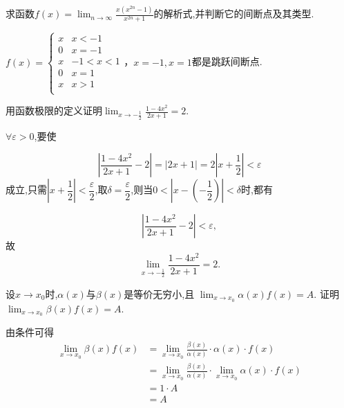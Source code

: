 \begin{problem}求函数$\displaystyle f(x) = \lim_{n \rightarrow \infty}\frac{x(x^{2n} - 1)}{x^{2n} + 1}$的解析式,并判断它的间断点及其类型.
	
	\begin{solution} $f(x) =  \begin{cases}
		x & x < - 1 \\
		0 & x = - 1 \\x & - 1 < x < 1 \\
		0 & x = 1 \\
		x & x > 1 \\
		\end{cases} $，$x = - 1,x = 1$都是跳跃间断点.
		
	\end{solution}


\end{problem}



\begin{problem} 用函数极限的定义证明$\displaystyle \lim_{x \rightarrow - \frac{1}{2}}\frac{1 - 4x^{2}}{2x + 1} = 2$.
	
	\begin{solution} ${\forall} {\varepsilon > 0}$,要使
		
		$$\left| \frac{1 - 4x^{2}}{2x + 1} - 2 \right| = \left| 2x + 1 \right| = 2\left| x + \frac{1}{2} \right| < \varepsilon$$
		成立,只需$\left| x + \dfrac{1}{2} \right| < \dfrac{\varepsilon}{2}$,取$\delta = \dfrac{\varepsilon}{2}$,则当$0 < \left| x - ( - \dfrac{1}{2}) \right| < \delta$时,都有
		
		$$\left| \frac{1 - 4x^{2}}{2x + 1} - 2 \right| < \varepsilon,$$
		故
		$$\lim_{x \rightarrow - \frac{1}{2}}\frac{1 - 4x^{2}}{2x + 1} = 2.$$
		
	\end{solution}
\end{problem}           


\begin{problem}设$x \rightarrow x_{0}$时,$\alpha(x)$与$\beta(x)$是等价无穷小,且 $\lim_{x \rightarrow x_{0}}\alpha(x)f(x) = A$. 证明$\lim_{x \rightarrow x_{0}}\beta(x)f(x) = A$.
	
	\begin{solution}
		由条件可得
		$$\begin{aligned} \lim _{x \rightarrow x_{0}} \beta(x) f(x) &=\lim _{x \rightarrow x_{0}} \frac{\beta(x)}{\alpha(x)} \cdot \alpha(x) \cdot f(x) \\ &=\lim _{x \rightarrow x_{0}} \frac{\beta(x)}{\alpha(x)} \cdot \lim _{x \rightarrow x_{0}} \alpha(x) \cdot f(x) \\ &=1 \cdot A \\ &=A \end{aligned}$$
		
	\end{solution}
		
\end{problem}          

